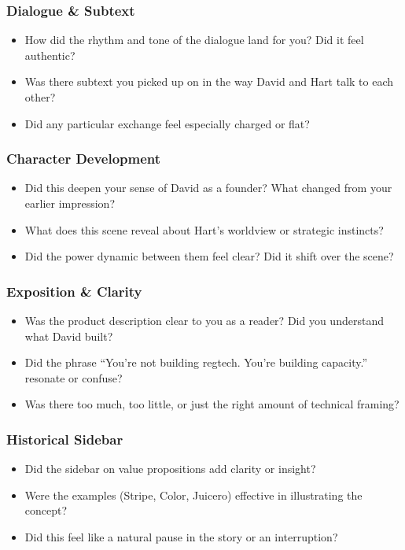 \subsubsection{Dialogue \& Subtext}

\begin{itemize}
  \item How did the rhythm and tone of the dialogue land for you? Did it feel authentic?
  \item Was there subtext you picked up on in the way David and Hart talk to each other?
  \item Did any particular exchange feel especially charged or flat?
\end{itemize}

\subsubsection{Character Development}

\begin{itemize}
  \item Did this deepen your sense of David as a founder? What changed from your earlier impression?
  \item What does this scene reveal about Hart’s worldview or strategic instincts?
  \item Did the power dynamic between them feel clear? Did it shift over the scene?
\end{itemize}

\subsubsection{Exposition \& Clarity}

\begin{itemize}
  \item Was the product description clear to you as a reader? Did you understand what David built?
  \item Did the phrase “You’re not building regtech. You’re building capacity.” resonate or confuse?
  \item Was there too much, too little, or just the right amount of technical framing?
\end{itemize}

\subsubsection{Historical Sidebar}

\begin{itemize}
  \item Did the sidebar on value propositions add clarity or insight?
  \item Were the examples (Stripe, Color, Juicero) effective in illustrating the concept?
  \item Did this feel like a natural pause in the story or an interruption?
\end{itemize}


